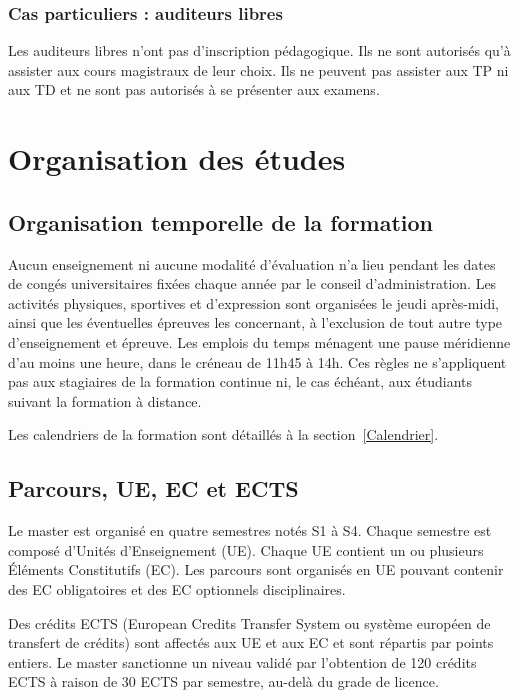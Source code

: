 \documentclass[a4paper,11pt]{article}
\begin{document}
\subsubsection{Cas particuliers : auditeurs libres}
Les auditeurs libres n'ont pas d'inscription pédagogique. Ils ne sont autorisés qu'à assister aux cours magistraux de leur choix. Ils ne peuvent pas assister aux TP ni aux TD et ne sont pas autorisés à se présenter aux examens.

\section{Organisation des études}\label{Organisation}

\subsection{Organisation temporelle de la formation}\label{Temporel}

Aucun enseignement ni aucune modalité d'évaluation n'a lieu pendant les dates de congés universitaires fixées chaque année par le conseil d'administration. Les activités physiques, sportives et d'expression sont organisées le jeudi après-midi, ainsi que les éventuelles épreuves les concernant, à l'exclusion de tout autre type d'enseignement et épreuve. Les emplois du temps ménagent une pause méridienne d'au moins une heure, dans le créneau de 11h45 à 14h. Ces règles ne s'appliquent pas aux stagiaires de la formation continue ni, le cas échéant, aux étudiants suivant la formation à distance.

Les calendriers de la formation sont détaillés à la section~\ref{Calendrier}.

\subsection{Parcours, UE, EC et ECTS}

Le master est organisé en quatre semestres notés S1 à S4. Chaque semestre est composé d'Unités d'Enseignement (UE). Chaque UE contient un ou plusieurs Éléments Constitutifs (EC). Les parcours sont organisés en UE pouvant contenir des EC obligatoires et des EC optionnels disciplinaires.

Des crédits ECTS (European Credits Transfer System ou système européen de transfert de crédits) sont affectés aux UE et aux EC et sont répartis par points entiers. Le master sanctionne un niveau validé par l'obtention de 120 crédits ECTS à raison de 30 ECTS par semestre, au-delà du grade de licence.
\end{document}

